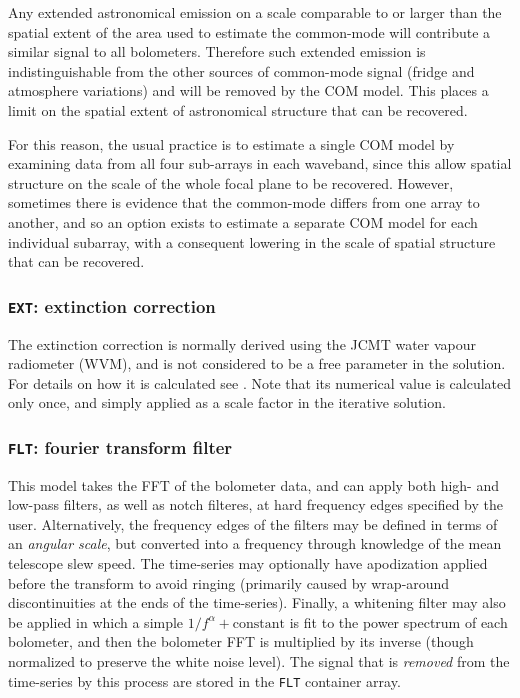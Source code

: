\documentclass[useAMS,usenatbib,nofootinbib]{mn2e}
\begin{document}
Any extended astronomical emission on a scale comparable to or larger
than the spatial extent of the area used to estimate the common-mode will
contribute a similar signal to all bolometers. Therefore such extended
emission is indistinguishable from the other sources of common-mode
signal (fridge and atmosphere variations) and will be removed by the COM
model. This places a limit on the spatial extent of astronomical
structure that can be recovered.

For this reason, the usual practice is to estimate a single COM model by
examining data from all four sub-arrays in each waveband, since this
allow spatial structure on the scale of the whole focal plane to be
recovered. However, sometimes there is evidence that the common-mode
differs from one array to another, and so an option exists to estimate a
separate COM model for each individual subarray, with a consequent
lowering in the scale of spatial structure that can be recovered.

\subsubsection{\texttt{EXT}: extinction correction}
\label{sec:ext}

The extinction correction is normally derived using the JCMT water
vapour radiometer (WVM), and is not considered to be a free parameter
in the solution. For details on how it is calculated see
\citet{dempsey2011}. Note that its numerical value is calculated only
once, and simply applied as a scale factor in the iterative solution.

\subsubsection{\texttt{FLT}: fourier transform filter}
\label{sec:flt}

This model takes the FFT of the bolometer data, and can apply both
high- and low-pass filters, as well as notch filteres, at hard
frequency edges specified by the user. Alternatively, the frequency
edges of the filters may be defined in terms of an \emph{angular
  scale}, but converted into a frequency through knowledge of the mean
telescope slew speed. The time-series may optionally have apodization
applied before the transform to avoid ringing (primarily caused by
wrap-around discontinuities at the ends of the time-series). Finally,
a whitening filter may also be applied in which a simple $1/f^\alpha +
\mathrm{constant}$ is fit to the power spectrum of each bolometer, and
then the bolometer FFT is multiplied by its inverse (though normalized
to preserve the white noise level).  The signal that is \emph{removed}
from the time-series by this process are stored in the \texttt{FLT}
container array.
\end{document}
